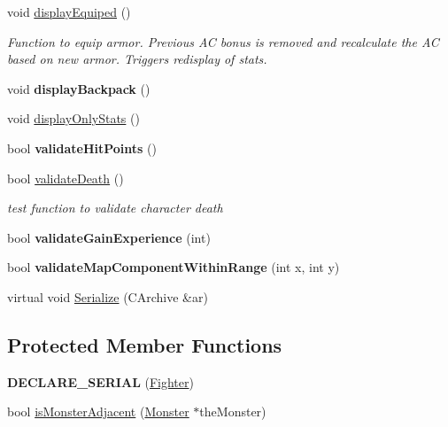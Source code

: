 \begin{DoxyCompactItemize}
\hypertarget{class_fighter_a30734efb2140029276fd7528d28685fc}{}\label{class_fighter_a30734efb2140029276fd7528d28685fc} 
void \hyperlink{class_fighter_a30734efb2140029276fd7528d28685fc}{display\+Equiped} ()
\begin{DoxyCompactList}\small\item\em Function to equip armor. Previous AC bonus is removed and recalculate the AC based on new armor. Triggers redisplay of stats. \end{DoxyCompactList}\item 
\hypertarget{class_fighter_a1f026b1314d058a8033a19328a40e4cb}{}\label{class_fighter_a1f026b1314d058a8033a19328a40e4cb} 
void {\bfseries display\+Backpack} ()
\item 
void \hyperlink{class_fighter_a5dd8b95b965832bbae65d6285a9bac53}{display\+Only\+Stats} ()
\item 
\hypertarget{class_fighter_a235df759d42bb20bd6314abe806dd6ce}{}\label{class_fighter_a235df759d42bb20bd6314abe806dd6ce} 
bool {\bfseries validate\+Hit\+Points} ()
\item 
\hypertarget{class_fighter_a7372ff74df453241ee2d990a265fd71c}{}\label{class_fighter_a7372ff74df453241ee2d990a265fd71c} 
bool \hyperlink{class_fighter_a7372ff74df453241ee2d990a265fd71c}{validate\+Death} ()
\begin{DoxyCompactList}\small\item\em test function to validate character death \end{DoxyCompactList}\item 
\hypertarget{class_fighter_a05f927eea7af56811cce5a8ba2c8a349}{}\label{class_fighter_a05f927eea7af56811cce5a8ba2c8a349} 
bool {\bfseries validate\+Gain\+Experience} (int)
\item 
\hypertarget{class_fighter_a66d147cbc9c3690009cad90a6ee35f42}{}\label{class_fighter_a66d147cbc9c3690009cad90a6ee35f42} 
bool {\bfseries validate\+Map\+Component\+Within\+Range} (int x, int y)
\item 
virtual void \hyperlink{class_fighter_a44b8e8e71e55b645c4fe7f67ef844e87}{Serialize} (C\+Archive \&ar)
\end{DoxyCompactItemize}
\subsection*{Protected Member Functions}
\begin{DoxyCompactItemize}
\item 
\hypertarget{class_fighter_a349455a2930ba35778477b876c5ea0eb}{}\label{class_fighter_a349455a2930ba35778477b876c5ea0eb} 
{\bfseries D\+E\+C\+L\+A\+R\+E\+\_\+\+S\+E\+R\+I\+AL} (\hyperlink{class_fighter}{Fighter})
\item 
bool \hyperlink{class_fighter_a4d5e0c68989f19bc3cd922c0fb46c718}{is\+Monster\+Adjacent} (\hyperlink{class_monster}{Monster} $\ast$the\+Monster)
\end{DoxyCompactItemize}
